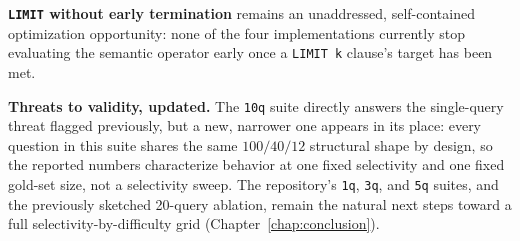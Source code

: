 \textbf{\texttt{LIMIT} without early termination} remains an
unaddressed, self-contained optimization opportunity: none of the four
implementations currently stop evaluating the semantic operator early
once a \texttt{LIMIT k} clause's target has been met.

\textbf{Threats to validity, updated.} The \texttt{10q} suite directly
answers the single-query threat flagged previously, but a new,
narrower one appears in its place: every question in this suite shares
the same $100/40/12$ structural shape by design, so the reported
numbers characterize behavior at one fixed selectivity and one fixed
gold-set size, not a selectivity sweep. The repository's \texttt{1q},
\texttt{3q}, and \texttt{5q} suites, and the previously sketched
20-query ablation, remain the natural next steps toward a full
selectivity-by-difficulty grid (Chapter~\ref{chap:conclusion}).
